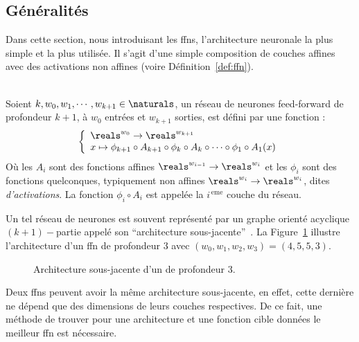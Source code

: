 \subsection{Généralités}

Dans cette section, nous introduisant les \glspl{ffn},
l'architecture neuronale la plus simple et la plus utilisée.
Il s'agit d'une simple composition de couches affines avec des activations non affines 
(voire Définition~\ref{def:ffn}).


\begin{definition}\ \\
    \label{def:ffn}
    Soient \(k, w_0, w_1, \cdots, w_{k+1}\in\naturals\), 
    un réseau de neurones feed-forward de profondeur \(k+1\), à \(w_0\) entrées et \(w_{k+1}\) sorties, 
    est défini par une fonction :
    \begin{equation}
        \label{eq:ffn}
        \left\{
        \begin{array}{l}
            \reals^{w_0} \to \reals^{w_{k+1}}\\
            x\mapsto
            \phi_{k+1} \circ A_{k+1} \circ \phi_k \circ A_k \circ \cdots \circ \phi_1 \circ A_1(x)
        \end{array}
        \right.
    \end{equation}
    Où les \(A_i\) sont des fonctions affines \(\reals^{w_{i-1}}\to\reals^{w_i}\) 
    et les \(\phi_i\) sont des fonctions quelconques, typiquement non affines
    \(\reals^{w_i}\to\reals^{w_i}\), dites \emph{d'activations}.
    La fonction \(\phi_i\circ A_i\) est appelée la \(i^{\, \mathrm{eme}}\) couche du réseau.
\end{definition}

Un tel réseau de neurones est souvent représenté par 
un graphe orienté acyclique \((k+1)-\)partie  appelé son ``architecture sous-jacente''~\parencite{Kearns_Vazirani_1994}. 
La Figure~\ref{fig:ffn} illustre l'architecture d'un \gls{ffn} de profondeur 3
avec \((w_0, w_1, w_2, w_3) = (4, 5, 5, 3)\).


\begin{figure}[hbt]
    \begin{center}
        
    \end{center}
    \caption{Architecture sous-jacente d'un  de profondeur 3.}
    \label{fig:ffn}
\end{figure}

Deux \glspl{ffn} peuvent avoir la même architecture sous-jacente,
en effet, cette dernière ne dépend que des dimensions de leurs couches respectives.
De ce fait, une méthode de trouver pour une architecture et une fonction cible données 
le meilleur \gls{ffn} est nécessaire.

